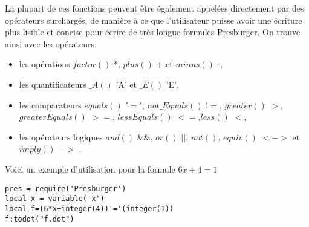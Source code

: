 La plupart de ces fonctions peuvent être également appelées directement par des opérateurs surchargés, de manière à ce que l'utilisateur puisse avoir une écriture plus lisible et concise pour écrire de très longue formules Presburger. On trouve ainsi avec les opérateurs:
\begin{itemize}
 \item les opérations $factor()$ *, $plus()$ + et $minus()$ -,
 \item les quantificateurs $\_A()$ 'A' et $\_E()$ 'E',
 \item les comparateurs $equals()$ $'='$, $not\_Equals()$ $!=$, $greater()$ $>$, $greaterEquals()$ $>=$, $lessEquals()$ $<=$,$less()$ $<$,
 \item les opérateurs logiques $and()$ $\&\&$, $or()$ $||$, $not()$, $equiv()$ $<->$  et $imply()$ $->$ .
\end{itemize}
Voici un exemple d'utilisation pour la formule $6x + 4 = 1$\\
 
\begin{lstlisting}[mathescape=true, frame=single]
pres = require('Presburger')
local x = variable('x')
local f=(6*x+integer(4))'='(integer(1))
f:todot("f.dot")
\end{lstlisting}


